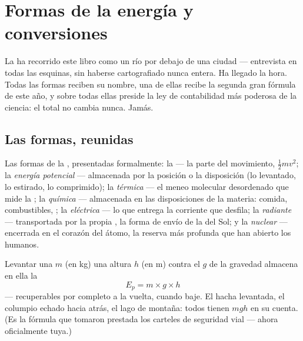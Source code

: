 \chapter{Formas de la energía y conversiones}\label{ch:g9:energy-conversions}

La  ha recorrido este libro como un río por debajo de una
ciudad --- entrevista en todas las esquinas, sin haberse cartografiado
nunca entera. Ha llegado la hora. Todas las formas reciben su nombre,
una de ellas recibe la segunda gran fórmula de este año, y sobre todas
ellas preside la ley de contabilidad más poderosa de la ciencia: el
total no cambia nunca. Jamás.

\section{Las formas, reunidas}

\begin{definition}\label{def:g9:energy-conversions:forms}
Las formas de la , presentadas formalmente: la
\emph{} --- la parte del movimiento, $\frac12 m
v^2$; la \emph{energía potencial} ---
almacenada por la posición o la disposición (lo levantado, lo estirado,
lo comprimido); la \emph{ térmica} --- el meneo
molecular desordenado que mide la ; la
\emph{ química} --- almacenada en las disposiciones de la
materia: comida, combustibles, ; la \emph{
eléctrica} --- lo que entrega la corriente que desfila; la
\emph{ radiante} --- transportada por la propia
, la forma de envío de la  del Sol; y la
\emph{ nuclear} --- encerrada en el corazón del átomo, la
reserva más profunda que han abierto los humanos.
\end{definition}

\begin{proposition}\label{prop:g9:energy-conversions:ep}
Levantar una  $m$ (en \unit{kg}) una altura $h$ (en \unit{m})
contra el $g$ de la gravedad almacena en ella la 
\[
E_p = m \times g \times h
\]
 --- recuperables por completo a la vuelta, cuando baje. El
hacha levantada, el columpio echado hacia atrás, el lago de montaña:
todos tienen $m g h$ en su cuenta. (Es la fórmula que tomaron prestada
los carteles de seguridad vial --- ahora oficialmente tuya.)
\end{proposition}

